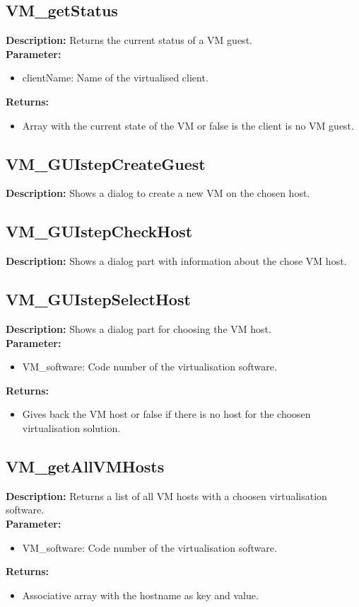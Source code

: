 \subsection{VM\_getStatus}
\textbf{Description:} Returns the current status of a VM guest.\\
\textbf{Parameter:}
\begin{itemize}
\item clientName: Name of the virtualised client.
\end{itemize}
\textbf{Returns:}
\begin{itemize}
\item Array with the current state of the VM or false is the client is no VM guest.
\end{itemize}

\subsection{VM\_GUIstepCreateGuest}
\textbf{Description:} Shows a dialog to create a new VM on the chosen host.\\

\subsection{VM\_GUIstepCheckHost}
\textbf{Description:} Shows a dialog part with information about the chose VM host.\\

\subsection{VM\_GUIstepSelectHost}
\textbf{Description:} Shows a dialog part for choosing the VM host.\\
\textbf{Parameter:}
\begin{itemize}
\item VM\_software: Code number of the virtualisation software.
\end{itemize}
\textbf{Returns:}
\begin{itemize}
\item Gives back the VM host or false if there is no host for the choosen virtualisation solution.
\end{itemize}

\subsection{VM\_getAllVMHosts}
\textbf{Description:} Returns a list of all VM hosts with a choosen virtualisation software.\\
\textbf{Parameter:}
\begin{itemize}
\item VM\_software: Code number of the virtualisation software.
\end{itemize}
\textbf{Returns:}
\begin{itemize}
\item Associative array with the hostname as key and value.
\end{itemize}

